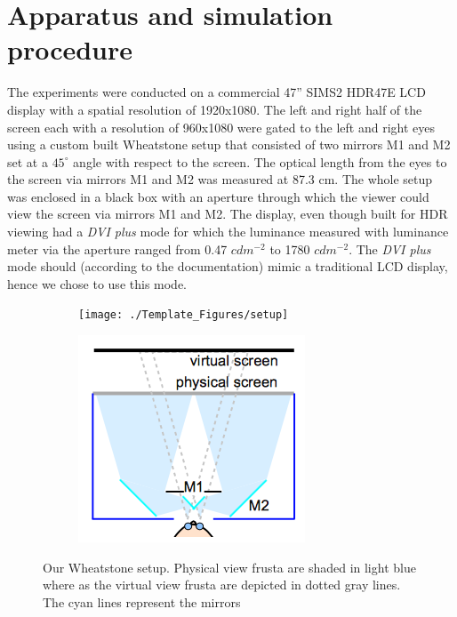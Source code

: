 \section{Apparatus and simulation procedure}
The experiments were conducted on a commercial 47'' SIMS2 HDR47E LCD display with a spatial resolution of 1920x1080. The left and right half of the screen each with a resolution of 960x1080 were gated to the left and right eyes using a custom built Wheatstone setup \cite{ wiki:wheatstone} that consisted of two mirrors M1 and M2 set at a $45^\circ$ angle with respect to the screen. The optical length from the eyes to the screen via mirrors M1 and M2 was measured at 87.3 cm. The whole setup was enclosed in a black box with an aperture through which the viewer could view the screen via mirrors M1 and M2. The display, even though built for HDR viewing had a \emph{DVI plus} mode for which the luminance measured with luminance meter via the aperture ranged from 0.47 $cdm^{-2}$ to 1780 $cdm^{-2}$. The \emph{DVI plus} mode should (according to the documentation) mimic a traditional LCD display, hence we chose to use this mode.
\begin{figure}[htbp]
    \begin{subfigure}[b]{0.5\textwidth}
        \texttt{[image: ./Template\_Figures/setup]}
        \caption{}\label{fig:setup}
    \end{subfigure}
    \begin{subfigure}[b]{0.4\textwidth}
        \includegraphics[width=\textwidth]{./Template_Figures/setup_sch}
        \caption{}\label{fig:setup_sch}
    \end{subfigure}
    \caption{Our Wheatstone setup. Physical view frusta are shaded in light blue where as the virtual view frusta are depicted in dotted gray lines. The cyan lines represent the mirrors \cite{vangorp2014depth}\label{fig:wheatstone_setup}}
\end{figure}

